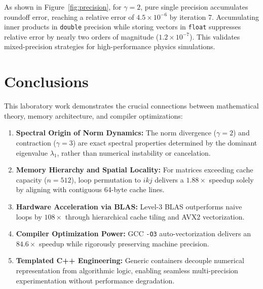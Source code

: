 \documentclass[11pt,a4paper]{article}
\begin{document}
As shown in Figure~\ref{fig:precision}, for $\gamma=2$, pure single precision accumulates roundoff error, reaching a relative error of $4.5 \times 10^{-6}$ by iteration 7. Accumulating inner products in \texttt{double} precision while storing vectors in \texttt{float} suppresses relative error by nearly two orders of magnitude ($1.2 \times 10^{-7}$). This validates mixed-precision strategies for high-performance physics simulations.

\section{Conclusions}

This laboratory work demonstrates the crucial connections between mathematical theory, memory architecture, and compiler optimizations:
\begin{enumerate}
    \item \textbf{Spectral Origin of Norm Dynamics:} The norm divergence ($\gamma=2$) and contraction ($\gamma=3$) are exact spectral properties determined by the dominant eigenvalue $\lambda_1$, rather than numerical instability or cancelation.
    \item \textbf{Memory Hierarchy and Spatial Locality:} For matrices exceeding cache capacity ($n=512$), loop permutation to $ikj$ delivers a $1.88\times$ speedup solely by aligning with contiguous 64-byte cache lines.
    \item \textbf{Hardware Acceleration via BLAS:} Level-3 BLAS outperforms naive loops by $108\times$ through hierarchical cache tiling and AVX2 vectorization.
    \item \textbf{Compiler Optimization Power:} GCC \texttt{-O3} auto-vectorization delivers an $84.6\times$ speedup while rigorously preserving machine precision.
    \item \textbf{Templated C++ Engineering:} Generic containers decouple numerical representation from algorithmic logic, enabling seamless multi-precision experimentation without performance degradation.
\end{enumerate}
\end{document}
